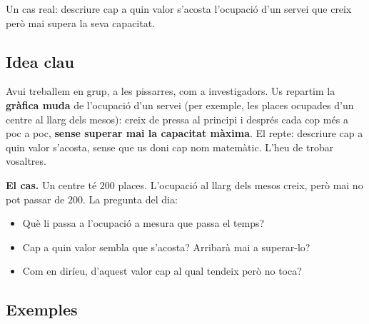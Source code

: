 %
{Un cas real: descriure cap a quin valor s'acosta l'ocupació d'un servei que creix però mai supera la seva capacitat.}

\subsection{Idea clau}

Avui treballem en grup, a les pissarres, com a investigadors. Us repartim la
\textbf{gràfica muda} de l'ocupació d'un servei (per exemple, les places ocupades
d'un centre al llarg dels mesos): creix de pressa al principi i després cada cop més
a poc a poc, \textbf{sense superar mai la capacitat màxima}. El repte: descriure cap a
quin valor s'acosta, sense que us doni cap nom matemàtic. L'heu de trobar vosaltres.

\begin{idea}
\textbf{El cas.} Un centre té $200$ places. L'ocupació al llarg dels mesos creix, però
mai no pot passar de $200$. La pregunta del dia:
\begin{itemize}[leftmargin=1.4em, itemsep=2pt]
  \item Què li passa a l'ocupació a mesura que passa el temps?
  \item Cap a quin valor sembla que s'acosta? Arribarà mai a superar-lo?
  \item Com en diríeu, d'aquest valor cap al qual tendeix però no toca?
\end{itemize}
\end{idea}

\subsection{Exemples}

